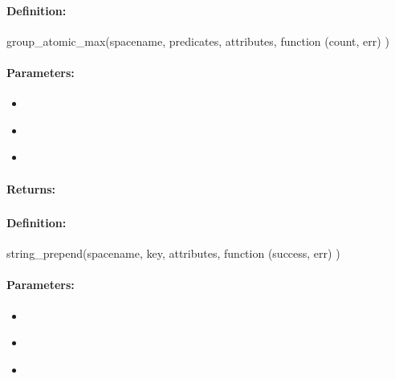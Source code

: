 \paragraph{Definition:}
\begin{javascriptcode}
group_atomic_max(spacename, predicates, attributes, function (count, err) {})
\end{javascriptcode}
\paragraph{Parameters:}
\begin{itemize}[noitemsep]
\item {}\\

\item {}\\

\item {}\\

\end{itemize}

\paragraph{Returns:}


\pagebreak
\subsubsection{}
\label{api:nodejs:string_prepend}


\paragraph{Definition:}
\begin{javascriptcode}
string_prepend(spacename, key, attributes, function (success, err) {})
\end{javascriptcode}
\paragraph{Parameters:}
\begin{itemize}[noitemsep]
\item {}\\

\item {}\\

\item {}\\

\end{itemize}

